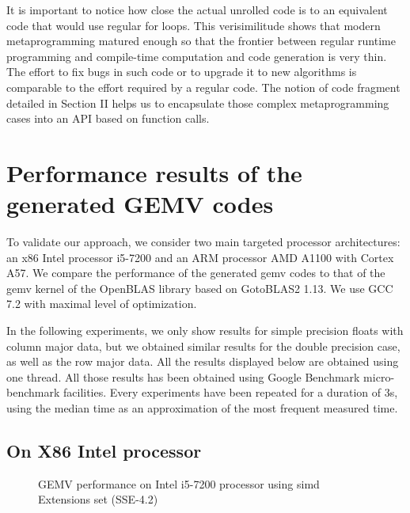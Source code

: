 \documentclass[../main]{subfiles}
\begin{document}
It is important to notice how close the actual unrolled code
is to an equivalent code that would use regular for loops. This
verisimilitude shows that modern metaprogramming matured
enough so that the frontier between regular runtime programming
and compile-time computation and code generation is
very thin. The effort to fix bugs in such code or to upgrade
it to new algorithms is comparable to the effort required
by a regular code. The notion of code fragment detailed
in Section II helps us to encapsulate those complex metaprogramming
cases into an API based on function calls.

\section{
  Performance results of the generated GEMV codes
}

To validate our approach, we consider two main targeted
processor architectures: an x86 Intel processor i5-7200 and an
ARM processor AMD A1100 with Cortex A57. We compare
the performance of the generated \gls{gemv} codes to that of the
\gls{gemv} kernel of the OpenBLAS library based on GotoBLAS2 1.13\cite{hpcs21}.
We use GCC 7.2\cite{hpcs22} with maximal level of optimization.

In the following experiments, we only show results
for simple precision floats with column major data, but we
obtained similar results for the double precision case, as well
as the row major data. All the results displayed below are
obtained using one thread. All those results has been obtained
using Google Benchmark micro-benchmark facilities. Every
experiments have been repeated for a duration of 3s, using
the median time as an approximation of the most frequent
measured time.

\subsection{
  On X86 Intel processor
}

\begin{figure}[h]
\fontsize{8}{10}\selectfont

\caption{
  GEMV performance on Intel i5-7200 processor using \gls{simd}
  Extensions set (SSE-4.2)
}
\label{fig:gemv-avx-sse}
\end{figure}
\end{document}
